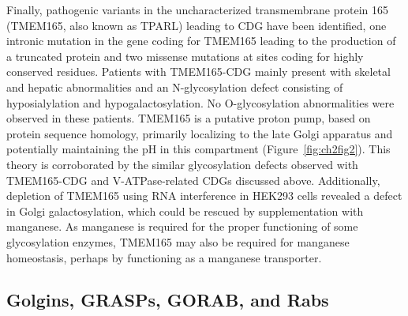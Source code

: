 Finally, pathogenic variants in the uncharacterized transmembrane protein 165 (TMEM165, also known as TPARL) leading to CDG have been identified\cite{foulquier_tmem165_2012}, one intronic mutation in the gene coding for TMEM165 leading to the production of a truncated protein and two missense mutations at sites coding for highly conserved residues. Patients with TMEM165-CDG mainly present with skeletal and hepatic abnormalities and an N-glycosylation defect consisting of hyposialylation and hypogalactosylation. No O-glycosylation abnormalities were observed in these patients. TMEM165 is a putative proton pump, based on protein sequence homology\cite{foulquier_tmem165_2012}, primarily localizing to the late Golgi apparatus and potentially maintaining the pH in this compartment (Figure~\ref{fig:ch2fig2}). This theory is corroborated by the similar glycosylation defects observed with TMEM165-CDG and V-ATPase-related CDGs discussed above. Additionally, depletion of TMEM165 using RNA interference in HEK293 cells revealed a defect in Golgi galactosylation, which could be rescued by supplementation with manganese\cite{potelle_glycosylation_2016}. As manganese is required for the proper functioning of some glycosylation enzymes\cite{park_slc39a8_2015,powell_metal_1976}, TMEM165 may also be required for manganese homeostasis, perhaps by functioning as a manganese transporter.

\subsection{Golgins, GRASPs, GORAB, and Rabs}

